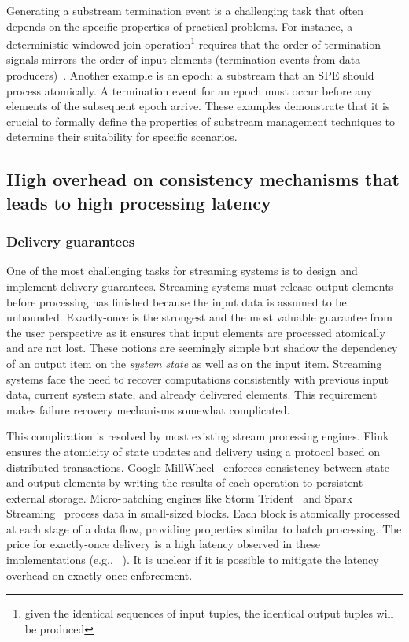 Generating a substream termination event is a challenging task that often depends on the specific properties of practical problems. For instance, a deterministic windowed join operation\footnote{given the identical sequences of input tuples, the identical output tuples will be produced} requires that the order of termination signals mirrors the order of input elements (termination events from data producers)~\cite{najdataei2019stretch, gulisano2016scalejoin}. Another example is an epoch: a substream that an SPE should process atomically. A termination event for an epoch must occur before any elements of the subsequent epoch arrive. These examples demonstrate that it is crucial to formally define the properties of substream management techniques to determine their suitability for specific scenarios.

\subsection{High overhead on consistency mechanisms that leads to high processing latency}

\subsubsection{Delivery guarantees}

One of the most challenging tasks for streaming systems is to design and implement delivery guarantees. 
Streaming systems must release output elements before processing has finished because the input data is assumed to be unbounded. Exactly-once is the strongest and the most valuable guarantee from the user perspective as it ensures that input elements are processed atomically and are not lost. These notions are seemingly simple but shadow the dependency of an output item on the {\em system state} as well as on the input item. 
Streaming systems face the need to recover computations consistently with previous input data, current system state, and already delivered elements.
This requirement makes failure recovery mechanisms somewhat complicated. 

This complication is resolved by most existing stream processing engines. 
Flink ensures the atomicity of state updates and delivery using a protocol based on distributed transactions. 
Google MillWheel~\cite{Akidau:2013:MFS:2536222.2536229} enforces consistency between state and output elements by writing the results of each operation to persistent external storage. 
Micro-batching engines like Storm Trident~\cite{apache:storm:trident} and Spark Streaming~\cite{Zaharia:2012:DSE:2342763.2342773} process data in small-sized blocks. 
Each block is atomically processed at each stage of a data flow, providing properties similar to batch processing. 
The price for exactly-once delivery is a high latency observed in these implementations (e.g., ~\cite{7530084, 7474816}). It is unclear if it is possible to mitigate the latency overhead on exactly-once enforcement.

